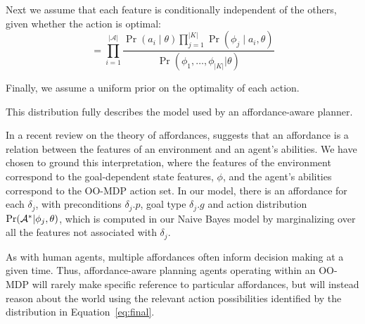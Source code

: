 \documentclass[conference]{IEEEtran}
\newcommand{\enote}[1]{\textcolor{Red}{\textbf{}}}
\begin{document}
Next we assume that each feature is conditionally independent of the others, given whether the action is optimal:
\begin{equation}
= \prod_{i=1}^{|\mathcal{A}|} \frac{\Pr(a_i \mid \theta) \prod_{j=1}^{|K|} \Pr(\phi_j \mid a_i, \theta) }{\Pr(\phi_1, \ldots, \phi_{|K|} | \theta)}
\label{eq:final}
\end{equation}
\enote{It's confusing to me that order of terms in the numerator was swapped. Is there a reason for this?}

Finally, we assume a uniform prior \enote{why are we using a uniform prior instead of just frequency of action optimality in the training set? Maybe this is explained later... In any case I don't think we need to specify what our prior is -- at least not at his point in the paper} on the optimality of
each action.

This distribution fully describes the model used by an affordance-aware planner. 

In a recent review on the theory of affordances, \citet{chemero2003} suggests that an affordance
is a relation between the features of an environment and an agent's abilities. We have chosen to
ground this interpretation, where the features of the environment correspond to the goal-dependent
state features, $\phi$, and the agent's abilities correspond to the OO-MDP action set. In our model,
there is an affordance for each $\delta_j$, with preconditions $\delta_j.p$, goal type $\delta_j.g$ and
action distribution $\Pr({\cal A}^* | \phi_j, \theta)$, which is computed in our Naive Bayes model by
marginalizing over all the features not associated with $\delta_j$.
  
As with human agents, multiple affordances often inform decision making at a given time.
Thus, affordance-aware planning agents operating within an OO-MDP will rarely make specific
reference to particular affordances, but will instead reason about the world using the relevant
action possibilities identified by the distribution in Equation~\ref{eq:final}. 

\enote{A general note about this section, especially the last two paragraphs. The connecting up with affordances seems a bit tenuous and I think it would help to more obviously ground what exactly an affordance is for us within our mathematical model. I get that that is what the penultimate paragraph is getting at but that bit still confuses me a bit - Dave can we talk about this? Also I noted it before but it is still very unclear to me what theta is -- it seems like we could do just naive bayes over our binary features without anything else.}
\end{document}
